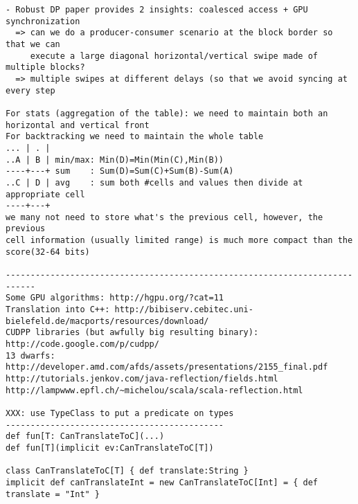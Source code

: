 \documentclass[11pt]{article}
\begin{document}
\begin{verbatim}
- Robust DP paper provides 2 insights: coalesced access + GPU synchronization
  => can we do a producer-consumer scenario at the block border so that we can
     execute a large diagonal horizontal/vertical swipe made of multiple blocks?
  => multiple swipes at different delays (so that we avoid syncing at every step

For stats (aggregation of the table): we need to maintain both an horizontal and vertical front
For backtracking we need to maintain the whole table
... | . |
..A | B | min/max: Min(D)=Min(Min(C),Min(B))
----+---+ sum    : Sum(D)=Sum(C)+Sum(B)-Sum(A)
..C | D | avg    : sum both #cells and values then divide at appropriate cell
----+---+
we many not need to store what's the previous cell, however, the previous
cell information (usually limited range) is much more compact than the score(32-64 bits)

----------------------------------------------------------------------------
Some GPU algorithms: http://hgpu.org/?cat=11
Translation into C++: http://bibiserv.cebitec.uni-bielefeld.de/macports/resources/download/
CUDPP libraries (but awfully big resulting binary): http://code.google.com/p/cudpp/
13 dwarfs: http://developer.amd.com/afds/assets/presentations/2155_final.pdf
http://tutorials.jenkov.com/java-reflection/fields.html
http://lampwww.epfl.ch/~michelou/scala/scala-reflection.html

XXX: use TypeClass to put a predicate on types
--------------------------------------------
def fun[T: CanTranslateToC](...)
def fun[T](implicit ev:CanTranslateToC[T])

class CanTranslateToC[T] { def translate:String }
implicit def canTranslateInt = new CanTranslateToC[Int] = { def translate = "Int" }
\end{verbatim}

\newpage


\end{document}
